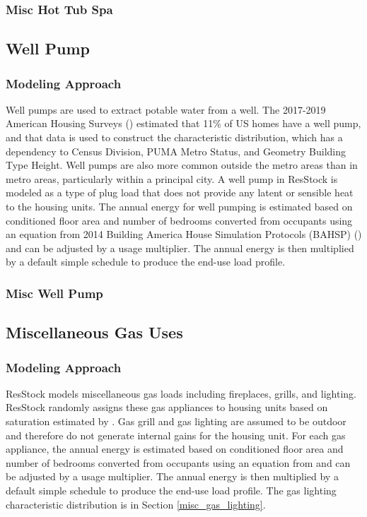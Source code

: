 \subsubsection{Misc Hot Tub Spa}


\subsection{Well Pump}
\subsubsection{Modeling Approach}
Well pumps are used to extract potable water from a well. The 2017-2019 American Housing Surveys ({\cite{AHS}}) estimated that 11\% of US homes have a well pump, and that data is used to construct the characteristic distribution, which has a dependency to Census Division, PUMA Metro Status, and Geometry Building Type Height. Well pumps are also more common outside the metro areas than in metro areas, particularly within a principal city. A well pump in ResStock is modeled as a type of plug load that does not provide any latent or sensible heat to the housing units. The annual energy for well pumping is estimated based on conditioned floor area and number of bedrooms converted from occupants using an equation from 2014 Building America House Simulation Protocols (BAHSP) (\cite{Wilson2014}) and can be adjusted by a usage multiplier. The annual energy is then multiplied by a default simple schedule to produce the end-use load profile.

\subsubsection{Misc Well Pump}


\subsection{Miscellaneous Gas Uses}
\subsubsection{Modeling Approach}
ResStock models miscellaneous gas loads including fireplaces, grills, and lighting. ResStock randomly assigns these gas appliances to housing units based on saturation estimated by \citet{Wilson2014}.  Gas grill and gas lighting are assumed to be outdoor and therefore do not generate internal gains for the housing unit. For each gas appliance, the annual energy is estimated based on conditioned floor area and number of bedrooms converted from occupants using an equation from \citet{bahsp_2010} and can be adjusted by a usage multiplier. The annual energy is then multiplied by a default simple schedule to produce the end-use load profile. The gas lighting characteristic distribution is in Section \ref{misc_gas_lighting}.

